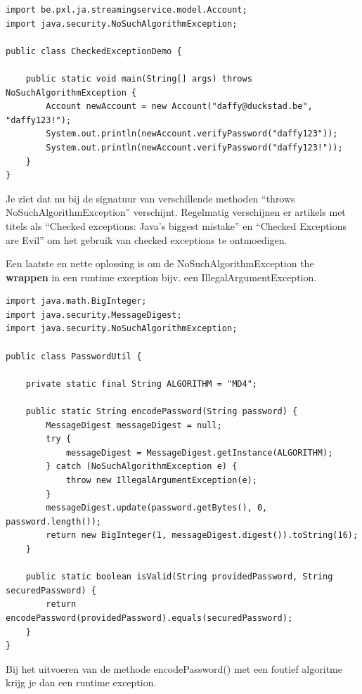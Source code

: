 \documentclass{tstextbook}
\begin{document}
\begin{lstlisting}
import be.pxl.ja.streamingservice.model.Account;
import java.security.NoSuchAlgorithmException;

public class CheckedExceptionDemo {

	public static void main(String[] args) throws NoSuchAlgorithmException {
		Account newAccount = new Account("daffy@duckstad.be", "daffy123!");
		System.out.println(newAccount.verifyPassword("daffy123"));
		System.out.println(newAccount.verifyPassword("daffy123!"));
	}
}
\end{lstlisting}

Je ziet dat nu bij de signatuur van verschillende methoden ``throws NoSuchAlgorithmException'' verschijnt.
Regelmatig verschijnen er artikels met titels als ``Checked exceptions: Java’s biggest mistake'' en ``Checked Exceptions are Evil'' om het gebruik van checked exceptions te ontmoedigen. 

Een laatste en nette oplossing is om de NoSuchAlgorithmException the \textbf{wrappen}  in een runtime exception bijv. een IllegalArgumentException.

\begin{lstlisting}
import java.math.BigInteger;
import java.security.MessageDigest;
import java.security.NoSuchAlgorithmException;

public class PasswordUtil {

	private static final String ALGORITHM = "MD4";

	public static String encodePassword(String password) {
		MessageDigest messageDigest = null;
		try {
			messageDigest = MessageDigest.getInstance(ALGORITHM);
		} catch (NoSuchAlgorithmException e) {
			throw new IllegalArgumentException(e);
		}
		messageDigest.update(password.getBytes(), 0, password.length());
		return new BigInteger(1, messageDigest.digest()).toString(16);
	}

	public static boolean isValid(String providedPassword, String securedPassword) {
		return encodePassword(providedPassword).equals(securedPassword);
	}
}
\end{lstlisting}

Bij het uitvoeren van de methode encodePassword() met een foutief algoritme krijg je dan een runtime exception.
\end{document}
